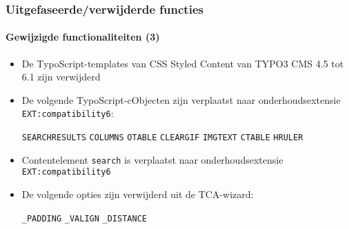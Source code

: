 \begin{frame}[fragile]
	\frametitle{Uitgefaseerde/verwijderde functies}
	\framesubtitle{Gewijzigde functionaliteiten (3)}

	\begin{itemize}
		\item De TypoScript-templates van CSS Styled Content van TYPO3 CMS 4.5 tot 6.1 zijn verwijderd

		\item De volgende TypoScript-cObjecten zijn verplaatst naar onderhoudsextensie
			\texttt{EXT:compatibility6}:

			\vspace{0.2cm}

			\small
				\texttt{SEARCHRESULTS} \tabto{3cm}\texttt{COLUMNS} \tabto{6cm}\texttt{OTABLE} \tabto{9cm}\texttt{CLEARGIF}\newline
				\texttt{IMGTEXT}       \tabto{3cm}\texttt{CTABLE}  \tabto{6cm}\texttt{HRULER}
			\normalsize

		\item Contentelement \texttt{search} is verplaatst naar onderhoudsextensie \texttt{EXT:compatibility6}

		\item De volgende opties zijn verwijderd uit de TCA-wizard:

			\vspace{0.2cm}

			\small
				\texttt{\_PADDING} \tabto{3cm}\texttt{\_VALIGN} \tabto{6cm}\texttt{\_DISTANCE}
			\normalsize

	\end{itemize}

\end{frame}


